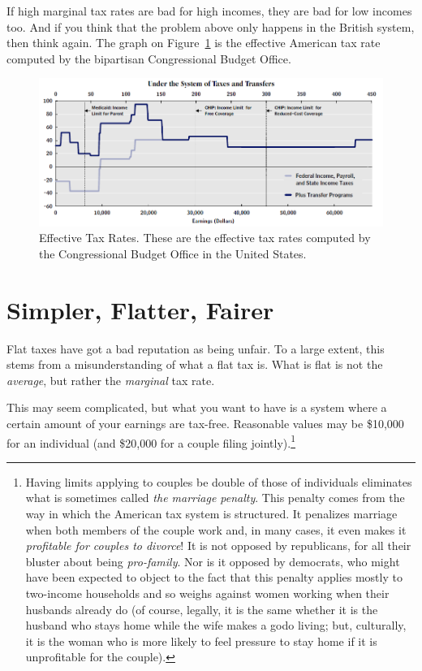 If high marginal tax rates are bad for high incomes, they are bad for low
incomes too. And if you think that the problem above only happens in the
British system, then think again. The graph on
Figure~\ref{fig:cbo-effective-tax-rate} is the effective American tax rate
computed by the bipartisan Congressional Budget Office.

\begin{figure}
\begin{center}
\includegraphics[width=.8\textwidth]{images/cbo-effective-tax-rate.png}
\end{center}
\caption{Effective Tax Rates. These are the effective tax rates computed by the
Congressional Budget Office in the United States.}
\label{fig:cbo-effective-tax-rate}
\end{figure}

\section{Simpler, Flatter, Fairer}

Flat taxes have got a bad reputation as being unfair. To a large extent, this
stems from a misunderstanding of what a flat tax is. What is flat is not the
\emph{average}, but rather the \emph{marginal} tax rate.

This may seem complicated, but what you want to have is a system where a
certain amount of your earnings are tax-free. Reasonable values may be \$10,000
for an individual (and \$20,000 for a couple filing jointly).\footnote{Having
limits applying to couples be double of those of individuals eliminates what is
sometimes called \emph{the marriage penalty}. This penalty comes from the way
in which the American tax system is structured. It penalizes marriage when both
members of the couple work and, in many cases, it even makes it
\emph{profitable for couples to divorce}! It is not opposed by republicans, for
all their bluster about being \emph{pro-family}. Nor is it opposed by
democrats, who might have been expected to object to the fact that this penalty
applies mostly to two-income households and so weighs against women working
when their husbands already do (of course, legally, it is the same whether it
is the husband who stays home while the wife makes a godo living; but,
culturally, it is the woman who is more likely to feel pressure to stay home if
it is unprofitable for the couple).}

